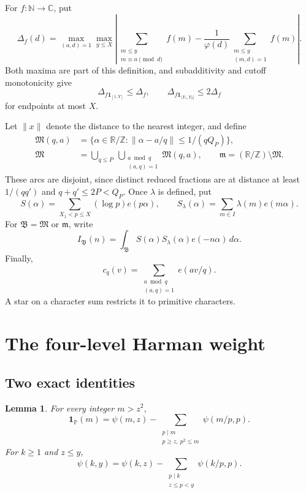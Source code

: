 \documentclass{amsart}
\newtheorem{lemma}{Lemma}[section]
\numberwithin{equation}{section}
\numberwithin{table}{section}
\newcommand{\N}{\mathbb N}
\newcommand{\Z}{\mathbb Z}
\newcommand{\R}{\mathbb R}
\newcommand{\PP}{\mathbb P}
\newcommand{\ind}{\mathbf 1}
\newcommand{\M}{\mathfrak M}
\newcommand{\m}{\mathfrak m}
\begin{document}
For $f:\N\to\mathbb C$, put
\begin{equation}\label{eq:Delta}
\Delta_f(d)=\max_{(a,d)=1}\max_{y\le X}
\left|\sum_{\substack{m\le y\\m\equiv a\pmod d}}f(m)
-\frac1{\varphi(d)}\sum_{\substack{m\le y\\(m,d)=1}}f(m)\right|.
\end{equation}
Both maxima are part of this definition, and subadditivity and cutoff
monotonicity give
\begin{equation}\label{eq:cutoffs}
\Delta_{f\ind_{[1,Y]}}\le\Delta_f,\qquad
\Delta_{f\ind_{(Y_1,Y_2]}}\le2\Delta_f
\end{equation}
for endpoints at most $X$.

Let $\|x\|$ denote the distance to the nearest integer, and define
\begin{equation}\label{eq:arcs}
\begin{aligned}
\M(q,a)&=\{\alpha\in\R/\Z:\|\alpha-a/q\|\le1/(qQ_P)\},\\
\M&=\bigcup_{q\le P}\ \bigcup_{\substack{a\bmod q\\(a,q)=1}}\M(q,a),
\qquad \m=(\R/\Z)\setminus\M.
\end{aligned}
\end{equation}
These arcs are disjoint, since distinct reduced fractions are at distance
at least $1/(qq')$ and $q+q'\le2P<Q_P$.
Once $\lambda$ is defined, put
\begin{equation}\label{eq:exponential-sums}
S(\alpha)=\sum_{X_1<p\le X}(\log p)e(p\alpha),\qquad
S_\lambda(\alpha)=\sum_{m\in I}\lambda(m)e(m\alpha).
\end{equation}
For $\mathfrak B=\M$ or $\m$, write
\[
I_{\mathfrak B}(n)=\int_{\mathfrak B}S(\alpha)S_\lambda(\alpha)e(-n\alpha)\,d\alpha.
\]
Finally,
\[
c_q(v)=\sum_{\substack{a\bmod q\\(a,q)=1}}e(av/q).
\]
A star on a character sum restricts it to primitive characters.

\section{The four-level Harman weight}\label{sec:weight}

\subsection{Two exact identities}

\begin{lemma}\label{lem:elementary-identities}
For every integer $m>z^2$,
\begin{equation}\label{eq:prime-isolation}
\ind_{\PP}(m)=\psi(m,z)
-\sum_{\substack{p\mid m\\p\ge z,\ p^2\le m}}\psi(m/p,p).
\end{equation}
For $k\ge1$ and $z\le y$,
\begin{equation}\label{eq:buchstab-step}
\psi(k,y)=\psi(k,z)
-\sum_{\substack{p\mid k\\z\le p<y}}\psi(k/p,p).
\end{equation}
\end{lemma}
\end{document}
